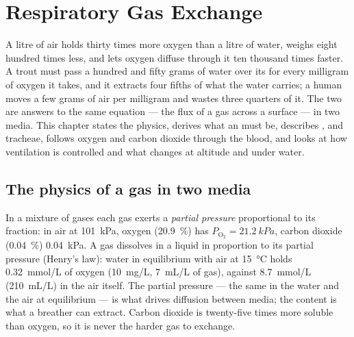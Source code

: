 \chapter{Respiratory Gas Exchange}\label{ch:b1:gas-exchange}

A litre of air holds thirty times more oxygen than a litre of water,
weighs eight hundred times less, and lets oxygen diffuse through it
ten thousand times faster. A trout must pass a hundred and fifty
grams of water over its  for every milligram of oxygen it takes,
and it extracts four fifths of what the water carries; a human moves
a few grams of air per milligram and wastes three quarters of it.
The two  are answers to the same equation --- the flux of a gas
across a surface --- in two media. This chapter states the physics,
derives what an  must be, describes ,  and
tracheae, follows oxygen and carbon dioxide through the blood, and
looks at how ventilation is controlled and what changes at altitude
and under water.

\section{The physics of a gas in two media}

\begin{definition}\label{def:b1:gas-exchange:partial}
In a mixture of gases each gas exerts a \emph{partial pressure}
proportional to its fraction: in air at \qty{101}{kPa}, oxygen
(\qty{20.9}{\%}) has $P_{\mathrm{O_2}} = \qty{21.2}{kPa}$, carbon
dioxide (\qty{0.04}{\%}) \qty{0.04}{kPa}. A gas dissolves in a liquid
in proportion to its partial pressure (Henry's law): water in
equilibrium with air at \qty{15}{\celsius} holds \qty{0.32}{mmol/L} of
oxygen (\qty{10}{mg/L}, \qty{7}{mL/L} of gas), against \qty{8.7}{mmol/L}
(\qty{210}{mL/L}) in the air itself. The partial pressure --- the same
in the water and the air at equilibrium --- is what drives diffusion
between media; the content is what a breather can extract. Carbon
dioxide is twenty-five times more soluble than oxygen, so it is never
the harder gas to exchange.
\end{definition}

